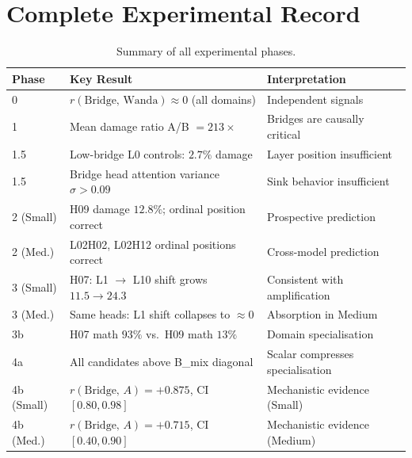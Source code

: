 \documentclass[11pt,a4paper]{article}
\theoremstyle{definition}
\theoremstyle{plain}
\begin{document}
\section{Complete Experimental Record}
\label{app:tables}

\begin{table}[h]
\centering
\caption{Summary of all experimental phases.}
\label{tab:summary}
\small
\begin{tabularx}{\linewidth}{lXl}
\toprule
\textbf{Phase} & \textbf{Key Result} & \textbf{Interpretation} \\
\midrule
0         & $r(\text{Bridge},\,\text{Wanda})\approx 0$ (all domains)
          & Independent signals \\
1         & Mean damage ratio A/B $= 213\times$
          & Bridges are causally critical \\
1.5       & Low-bridge L0 controls: $2.7\%$ damage
          & Layer position insufficient \\
1.5       & Bridge head attention variance $\sigma>0.09$
          & Sink behavior insufficient \\
2 (Small) & H09 damage $12.8\%$; ordinal position correct
          & Prospective prediction \\
2 (Med.)  & L02H02, L02H12 ordinal positions correct
          & Cross-model prediction \\
3 (Small) & H07: L1 $\to$ L10 shift grows $11.5\to24.3$
          & Consistent with amplification \\
3 (Med.)  & Same heads: L1 shift collapses to $\approx0$
          & Absorption in Medium \\
3b        & H07 math $93\%$ vs.\ H09 math $13\%$
          & Domain specialisation \\
4a        & All candidates above B\_mix diagonal
          & Scalar compresses specialisation \\
4b (Small)& $r(\text{Bridge},\,A)=+0.875$, CI $[0.80, 0.98]$
          & Mechanistic evidence (Small) \\
4b (Med.) & $r(\text{Bridge},\,A)=+0.715$, CI $[0.40, 0.90]$
          & Mechanistic evidence (Medium) \\
\bottomrule
\end{tabularx}
\end{table}
\end{document}

